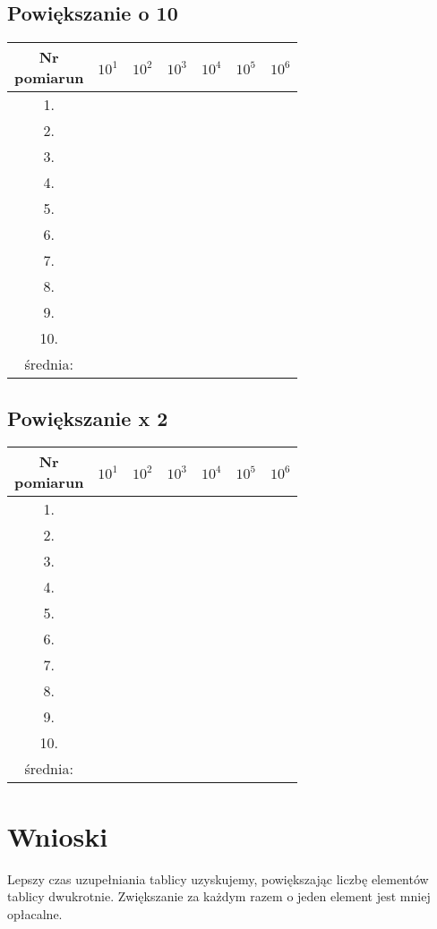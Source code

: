 \documentclass[12pt,a4paper]{article}
\begin{document}
\subsection{Powiększanie o 10}
\begin{tabular}{|c|c|c|c|c|c|c|} \hline
\diagbox[width=6em]{Nr \\pomiaru}{n} & $10^1$ & $10^2$ & $10^3$ & $10^4$ & $10^5$ & $10^6$\\ \hline
1. &&&&&& \\ \hline
2. &&&&&& \\ \hline
3. &&&&&& \\ \hline
4. &&&&&& \\ \hline
5. &&&&&& \\ \hline
6. &&&&&& \\ \hline
7. &&&&&& \\ \hline
8. &&&&&& \\ \hline
9. &&&&&& \\ \hline
10. &&&&&& \\ \hline
średnia: &&&&&& \\ \hline
\end{tabular}
\subsection{Powiększanie x 2}
\begin{tabular}{|c|c|c|c|c|c|c|} \hline
\diagbox[width=6em]{Nr \\pomiaru}{n} & $10^1$ & $10^2$ & $10^3$ & $10^4$ & $10^5$ & $10^6$\\ \hline
1. &&&&&& \\ \hline
2. &&&&&& \\ \hline
3. &&&&&& \\ \hline
4. &&&&&& \\ \hline
5. &&&&&& \\ \hline
6. &&&&&& \\ \hline
7. &&&&&& \\ \hline
8. &&&&&& \\ \hline
9. &&&&&& \\ \hline
10. &&&&&& \\ \hline
średnia: &&&&&& \\ \hline
\end{tabular}


\section{Wnioski}
Lepszy czas uzupełniania tablicy uzyskujemy, powiększając liczbę elementów tablicy dwukrotnie. Zwiększanie za każdym razem o jeden element jest mniej opłacalne.




\clearpage
\end{document}

